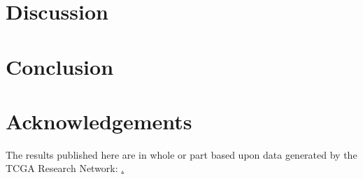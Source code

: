 \documentclass{bioinfo}
\begin{document}
%
%
%


\section{Discussion}

\section{Conclusion}

\section*{Acknowledgements}
The results published here are in whole or part based upon data generated by the TCGA Research Network: \href{http://cancergenome.nih.gov/}.
\end{document}
